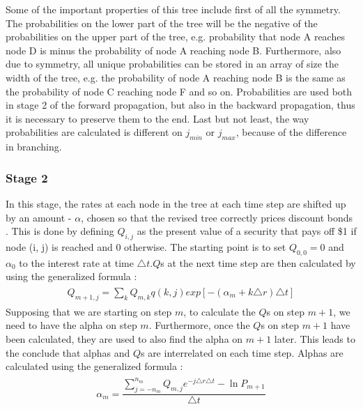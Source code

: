 Some of the important properties of this tree include first of all the symmetry. The probabilities on the lower part of the tree will be the negative of the probabilities on the upper part of the tree, e.g. probability that node A reaches node D is minus the probability of node A reaching node B. Furthermore, also due to symmetry, all unique probabilities can be stored in an array of size the width of the tree, e.g. the probability of node A reaching node B is the same as the probability of node C reaching node F and so on. Probabilities are used both in stage 2 of the forward propagation, but also in the backward propagation, thus it is necessary to preserve them to the end. Last but not least, the way probabilities are calculated is different on $j_{min}$ or $j_{max}$, because of the difference in branching. 

\subsubsection{Stage 2}
In this stage, the rates at each node in the tree at each time step are shifted up by an amount - $\alpha$, chosen so that the revised tree correctly prices discount bonds \cite[pg. 6]{uhwirt}. This is done by defining $Q_{i,j}$ as the present value of a security that pays off \$1 if node (i, j) is reached and 0 otherwise. The starting point is to set $Q_{0,0}=0$ and $\alpha_0$ to the interest rate at time $\triangle t$.$Q$s at the next time step are then calculated by using the generalized formula \cite[pg.705]{ofod}:  
\begin{equation}
\begin{gathered}
\begin{aligned}
Q_{m+1, j} = \sum_k Q_{m,k}q(k,j)exp[-(\alpha_m+k\triangle r)\triangle t]
\nonumber
\end{aligned}
\end{gathered}
\end{equation}
Supposing that we are starting on step $m$, to calculate the $Q$s on step $m+1$, we need to have the alpha on step $m$. Furthermore, once the $Q$s on step $m+1$ have been calculated, they are used to also find the alpha on $m+1$ later. This leads to the conclude that alphas and $Q$s are interrelated on each time step. Alphas are calculated using the generalized formula \cite[pg.703]{ofod}:
\begin{equation}
\begin{gathered}
\begin{aligned}
\alpha_{m} = \dfrac{\sum_{j=-n_m}^{n_m} Q_{m,j}e^{-j\triangle r\triangle t} - \ln{P_{m + 1}}}{\triangle t}
\nonumber
\end{aligned}
\end{gathered}
\end{equation}
